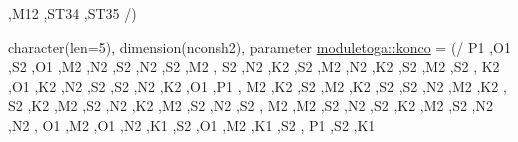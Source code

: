 \begin{DoxyCompactItemize}
\textquotesingle{},\textquotesingle{}\+M12 \textquotesingle{},\textquotesingle{}\+S\+T34 \textquotesingle{},\textquotesingle{}\+S\+T35 \textquotesingle{}/)
\item 
character(len=5), dimension(nconsh2), parameter \mbox{\hyperlink{namespacemoduletoga_aa6e7e4054f2ee5447ea73ce7fa1c250a}{moduletoga\+::konco}} = (/ \textquotesingle{}P1 \textquotesingle{},\textquotesingle{}O1 \textquotesingle{},\textquotesingle{}S2 \textquotesingle{},\textquotesingle{}O1 \textquotesingle{},\textquotesingle{}M2 \textquotesingle{},\textquotesingle{}N2 \textquotesingle{},\textquotesingle{}S2 \textquotesingle{},\textquotesingle{}N2 \textquotesingle{},\textquotesingle{}S2 \textquotesingle{},\textquotesingle{}M2 \textquotesingle{}, \textquotesingle{}S2 \textquotesingle{},\textquotesingle{}N2 \textquotesingle{},\textquotesingle{}K2 \textquotesingle{},\textquotesingle{}S2 \textquotesingle{},\textquotesingle{}M2 \textquotesingle{},\textquotesingle{}N2 \textquotesingle{},\textquotesingle{}K2 \textquotesingle{},\textquotesingle{}S2 \textquotesingle{},\textquotesingle{}M2 \textquotesingle{},\textquotesingle{}S2 \textquotesingle{}, \textquotesingle{}K2 \textquotesingle{},\textquotesingle{}O1 \textquotesingle{},\textquotesingle{}K2 \textquotesingle{},\textquotesingle{}N2 \textquotesingle{},\textquotesingle{}S2 \textquotesingle{},\textquotesingle{}S2 \textquotesingle{},\textquotesingle{}N2 \textquotesingle{},\textquotesingle{}K2 \textquotesingle{},\textquotesingle{}O1 \textquotesingle{},\textquotesingle{}P1 \textquotesingle{}, \textquotesingle{}M2 \textquotesingle{},\textquotesingle{}K2 \textquotesingle{},\textquotesingle{}S2 \textquotesingle{},\textquotesingle{}M2 \textquotesingle{},\textquotesingle{}K2 \textquotesingle{},\textquotesingle{}S2 \textquotesingle{},\textquotesingle{}S2 \textquotesingle{},\textquotesingle{}N2 \textquotesingle{},\textquotesingle{}M2 \textquotesingle{},\textquotesingle{}K2 \textquotesingle{}, \textquotesingle{}S2 \textquotesingle{},\textquotesingle{}K2 \textquotesingle{},\textquotesingle{}M2 \textquotesingle{},\textquotesingle{}S2 \textquotesingle{},\textquotesingle{}N2 \textquotesingle{},\textquotesingle{}K2 \textquotesingle{},\textquotesingle{}M2 \textquotesingle{},\textquotesingle{}S2 \textquotesingle{},\textquotesingle{}N2 \textquotesingle{},\textquotesingle{}S2 \textquotesingle{}, \textquotesingle{}M2 \textquotesingle{},\textquotesingle{}M2 \textquotesingle{},\textquotesingle{}S2 \textquotesingle{},\textquotesingle{}N2 \textquotesingle{},\textquotesingle{}S2 \textquotesingle{},\textquotesingle{}K2 \textquotesingle{},\textquotesingle{}M2 \textquotesingle{},\textquotesingle{}S2 \textquotesingle{},\textquotesingle{}N2 \textquotesingle{},\textquotesingle{}N2 \textquotesingle{}, \textquotesingle{}O1 \textquotesingle{},\textquotesingle{}M2 \textquotesingle{},\textquotesingle{}O1 \textquotesingle{},\textquotesingle{}N2 \textquotesingle{},\textquotesingle{}K1 \textquotesingle{},\textquotesingle{}S2 \textquotesingle{},\textquotesingle{}O1 \textquotesingle{},\textquotesingle{}M2 \textquotesingle{},\textquotesingle{}K1 \textquotesingle{},\textquotesingle{}S2 \textquotesingle{}, \textquotesingle{}P1 \textquotesingle{},\textquotesingle{}S2 \textquotesingle{},\textquotesingle{}K1 
\end{DoxyCompactItemize}
